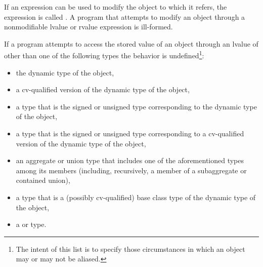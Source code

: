 \pnum
If an expression can be used to modify the object to which it refers,
the expression is called . A program that attempts
to modify an object through a nonmodifiable lvalue or rvalue expression
is ill-formed.

\pnum
If a program attempts to access the stored value of an object through an lvalue
of other than one of the following types the behavior is
undefined\footnote{The intent of this list is to specify those circumstances in which an object may or may not be aliased.}:

\begin{itemize}
\item the dynamic type of the object,

\item a cv-qualified version of the dynamic type of the object,

\item a type that is the signed or unsigned type corresponding to the
dynamic type of the object,

\item a type that is the signed or unsigned type corresponding to a
cv-qualified version of the dynamic type of the object,

\item an aggregate or union type that includes one of the aforementioned
types among its members (including, recursively, a member of a
subaggregate or contained union),

\item a type that is a (possibly cv-qualified) base class type of the dynamic type of
the object,

\item a  or   type.
\end{itemize}
